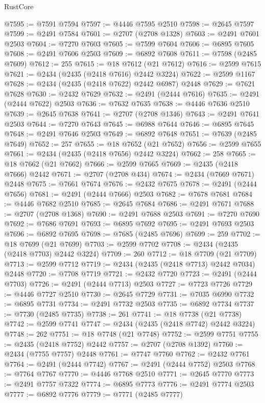 \begin{lexlean}{RustCore}
\begin{coremodule}
@7595 := @7591 @7594
@7597 := @4446 @7595 @2510
@7598 := @2645 @7597
@7599 := @2491 @7584
@7601 := @2707 (@2708 @1328)
@7603 := @2491 @7601 @2503
@7604 := @7270 @7603
@7605 := @7599 @7604
@7606 := @6895 @7605
@7608 := @2491 @7606 @2503
@7609 := @6892 @7608
@7611 := @7598 (@2485 @7609)
@7612 := 255
@7615 := @18 @7612 (@21 @7612)
@7616 := @2599 @7615
@7621 := @2434 (@2435 (@2418 @7616) @2442 @3224)
@7622 := @2599 @1167
@7628 := @2434 (@2435 (@2418 @7622) @2442 @6987) @2448
@7629 := @7621 @7628
@7630 := @2432 @7629
@7632 := @2491 (@2444 @7616)
@7635 := @2491 (@2444 @7622) @2503
@7636 := @7632 @7635
@7638 := @4446 @7636 @2510
@7639 := @2645 @7638
@7641 := @2707 (@2708 @1346)
@7643 := @2491 @7641 @2503
@7644 := @7270 @7643
@7645 := @6988 @7644
@7646 := @6895 @7645
@7648 := @2491 @7646 @2503
@7649 := @6892 @7648
@7651 := @7639 (@2485 @7649)
@7652 := 257
@7655 := @18 @7652 (@21 @7652)
@7656 := @2599 @7655
@7661 := @2434 (@2435 (@2418 @7656) @2442 @3224)
@7662 := 258
@7665 := @18 @7662 (@21 @7662)
@7666 := @2599 @7665
@7669 := @2435 (@2418 @7666) @2442
@7671 := @2707 (@2708 @434)
@7674 := @2434 (@7669 @7671) @2448
@7675 := @7661 @7674
@7676 := @2432 @7675
@7678 := @2491 (@2444 @7656)
@7681 := @2491 (@2444 @7666) @2503
@7682 := @7678 @7681
@7684 := @4446 @7682 @2510
@7685 := @2645 @7684
@7686 := @2491 @7671
@7688 := @2707 (@2708 @1368)
@7690 := @2491 @7688 @2503
@7691 := @7270 @7690
@7692 := @7686 @7691
@7693 := @6895 @7692
@7695 := @2491 @7693 @2503
@7696 := @6892 @7695
@7698 := @7685 (@2485 @7696)
@7699 := 259
@7702 := @18 @7699 (@21 @7699)
@7703 := @2599 @7702
@7708 := @2434 (@2435 (@2418 @7703) @2442 @3224)
@7709 := 260
@7712 := @18 @7709 (@21 @7709)
@7713 := @2599 @7712
@7719 := @2434 (@2435 (@2418 @7713) @2442 @7034) @2448
@7720 := @7708 @7719
@7721 := @2432 @7720
@7723 := @2491 (@2444 @7703)
@7726 := @2491 (@2444 @7713) @2503
@7727 := @7723 @7726
@7729 := @4446 @7727 @2510
@7730 := @2645 @7729
@7731 := @7035 @6990
@7732 := @6895 @7731
@7734 := @2491 @7732 @2503
@7735 := @6892 @7734
@7737 := @7730 (@2485 @7735)
@7738 := 261
@7741 := @18 @7738 (@21 @7738)
@7742 := @2599 @7741
@7747 := @2434 (@2435 (@2418 @7742) @2442 @3224)
@7748 := 262
@7751 := @18 @7748 (@21 @7748)
@7752 := @2599 @7751
@7755 := @2435 (@2418 @7752) @2442
@7757 := @2707 (@2708 @1392)
@7760 := @2434 (@7755 @7757) @2448
@7761 := @7747 @7760
@7762 := @2432 @7761
@7764 := @2491 (@2444 @7742)
@7767 := @2491 (@2444 @7752) @2503
@7768 := @7764 @7767
@7770 := @4446 @7768 @2510
@7771 := @2645 @7770
@7773 := @2491 @7757 @7322
@7774 := @6895 @7773
@7776 := @2491 @7774 @2503
@7777 := @6892 @7776
@7779 := @7771 (@2485 @7777)

\end{coremodule}
\end{lexlean}
